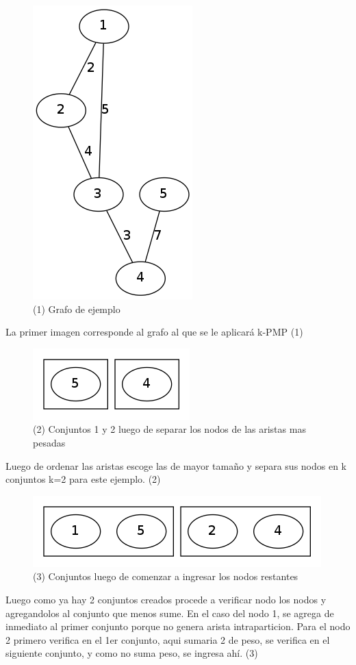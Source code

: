 \begin{figure}[H]
\begin{center}
\includegraphics[scale=0.4]{./img/greedy1.png}
\caption{(1) Grafo de ejemplo}
\end{center}
\end{figure}
La primer imagen corresponde al grafo al que se le aplicará k-PMP (1)

\begin{figure}[H]
\begin{center}
\includegraphics[scale=0.4]{./img/greedy2.png}
\caption{(2) Conjuntos 1 y 2 luego de separar los nodos de las aristas mas pesadas}
\end{center}
\end{figure}
Luego de ordenar las aristas escoge las de mayor tamaño y separa sus nodos en k conjuntos k=2 para este ejemplo. (2)

\begin{figure}[H]
\begin{center}
\includegraphics[scale=0.4]{./img/greedy3.png}
\caption{(3) Conjuntos luego de comenzar a ingresar los nodos restantes}
\end{center}
\end{figure}
Luego como ya hay 2 conjuntos creados procede a verificar nodo los nodos y agregandolos al conjunto que menos sume. En el caso del nodo 1, se agrega de inmediato al primer conjunto porque no genera arista intraparticion. Para el nodo 2 primero verifica en el 1er conjunto, aqui sumaria 2 de peso, se verifica en el siguiente conjunto, y como no suma peso, se ingresa ahí. (3)

